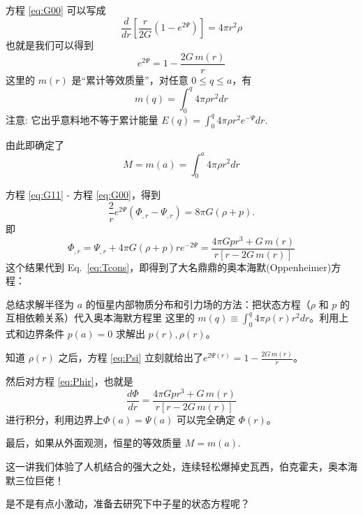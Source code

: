 \documentclass[CJK,13pt]{beamer}
\begin{document}
  \begin{frame}
    方程 \eqref{eq:G00} 可以写成
    \begin{equation}
      \frac{d}{dr} \left[\frac{r}{2G}\left(1-e^{2\Psi}\right)\right] = 4\pi r^2\rho \nonumber
    \end{equation}
    也就是我们可以得到
    \begin{equation}
      e^{2\Psi} = 1-\frac{2G\,m(r)}{r} \label{eq:Psi}
    \end{equation}
    这里的 $m(r)$ 是``累计等效质量''，对任意 $0\le q\le a$，有
    \begin{equation}
      m(q) = \int_0^q 4\pi \rho r^2 dr \label{eq:mdef}
    \end{equation}
        {\scriptsize 注意: 它出乎意料地不等于累计能量 $E(q) = \int_0^q 4\pi \rho r^2e^{-\Psi}dr$.}
        
    由此即确定了
    \begin{equation}
      M = m(a) = \int_0^a 4\pi \rho r^2 dr \label{eq:M}
    \end{equation}
  \end{frame}
  
  \begin{frame}
    方程 \eqref{eq:G11} - 方程 \eqref{eq:G00}，得到
    $$ \frac{2}{r}  e^{2 \Psi} \left(\Phi_{,r}-\Psi_{, r}\right)= 8\pi G(\rho+p).$$
    即
    \begin{equation}
      \Phi_{,r} = \Psi_{,r} + 4\pi G(\rho + p) r e^{-2\Psi} = \frac{4\pi Gp r^3+G\,m(r)}{r\left[r-2G\,m(r)\right]}\label{eq:Phir}
    \end{equation}
    这个结果代到 Eq.~\eqref{eq:Tcons}，即得到了大名鼎鼎的奥本海默(Oppenheimer)方程：
  \end{frame}

  \begin{frame}
    总结求解半径为 $a$ 的恒星内部物质分布和引力场的方法：把状态方程（$\rho$ 和 $p$ 的互相依赖关系）代入奥本海默方程里
    这里的 {\blue $m(q) \equiv \int_0^q 4\pi \rho(r) r^2 dr$}。利用上式和边界条件 {\blue $p(a)=0$} 求解出 $p(r), \rho(r)$。

    \skipline

    知道 $\rho(r)$ 之后，方程 \eqref{eq:Psi} 立刻就给出了{\blue $e^{2\Psi(r)}= 1-\frac{2G\,m(r)}{r} $}。

    \skipline

    然后对方程 \eqref{eq:Phir}，也就是{\blue
    \begin{equation}
      \frac{d\Phi}{dr} =  \frac{4\pi Gp r^3+G\,m(r)}{r\left[r-2G\,m(r)\right]}\nonumber
    \end{equation}}
    进行积分，利用边界上{\blue $\Phi(a)=\Psi(a)$} 可以完全确定 $\Phi(r)$。

    最后，如果从外面观测，恒星的等效质量 $M=m(a)$.
  \end{frame}

  \begin{frame}

    这一讲我们体验了人机结合的强大之处，连续轻松爆掉史瓦西，伯克霍夫，奥本海默三位巨佬！

    
    是不是有点小激动，准备去研究下中子星的状态方程呢？
    
  \end{frame}  
\ech
\end{document}
